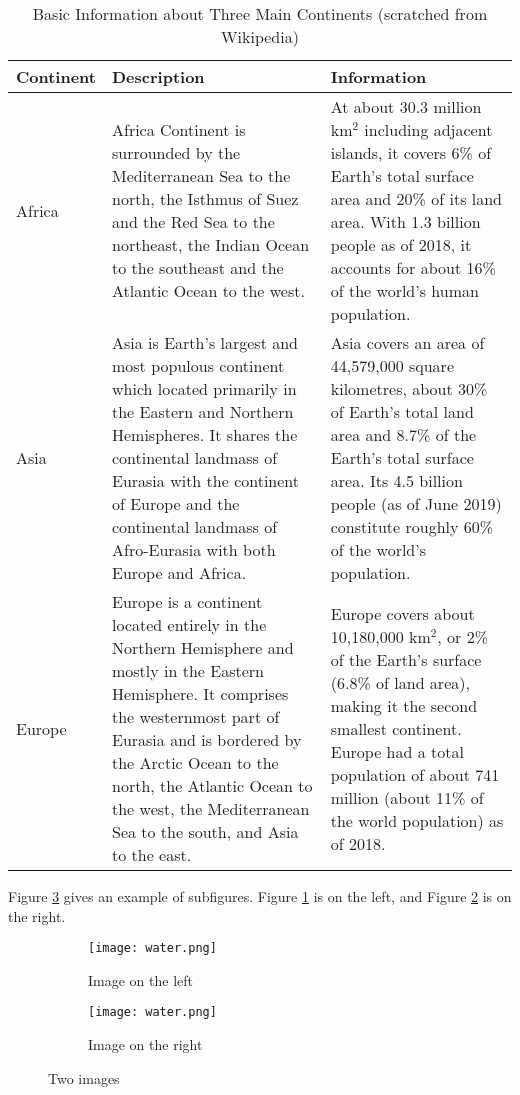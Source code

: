 \documentclass[12pt]{article}  %
\begin{document}
\begin{longtable}{ p{4em} p{14em} p{14em} }
\caption{Basic Information about Three Main Continents (scratched from Wikipedia)}
\label{tb:longtable}\\
\toprule
Continent & Description & Information \\
\midrule
Africa & Africa Continent is surrounded by the Mediterranean Sea to the
north, the Isthmus of Suez and the Red Sea to the northeast, the Indian
Ocean to the southeast and the Atlantic Ocean to the west. &
At about 30.3 million km$^2$ including adjacent islands, it covers 6\%
of Earth's total surface area and 20\% of its land area. With 1.3
billion people as of 2018, it accounts for about 16\% of the world's
human population. \\
\midrule
Asia & Asia is Earth's largest and most populous continent which
located primarily in the Eastern and Northern Hemispheres.
It shares the continental landmass of Eurasia with the continent
of Europe and the continental landmass of Afro-Eurasia with both
Europe and Africa. &
Asia covers an area of 44,579,000 square kilometres, about 30\%
of Earth's total land area and 8.7\% of the Earth's total surface
area. Its 4.5 billion people (as of June 2019) constitute roughly
60\% of the world's population. \\
\midrule
Europe & Europe is a continent located entirely in the Northern
Hemisphere and mostly in the Eastern Hemisphere. It comprises the
westernmost part of Eurasia and is bordered by the Arctic Ocean to
the north, the Atlantic Ocean to the west, the Mediterranean Sea to
the south, and Asia to the east. &
Europe covers about 10,180,000 km$^2$, or 2\% of the Earth's surface
(6.8\% of land area), making it the second smallest
continent. Europe had a total population of about 741 million (about
11\% of the world population) as of 2018. \\
\bottomrule
\end{longtable}

Figure \ref{fig:subfigures} gives an example of subfigures. Figure \ref{subfig:left} is on the left, and Figure \ref{subfig:right} is on the right.

\begin{figure}[htbp]
\centering
\begin{subfigure}[b]{.4\textwidth}
\texttt{[image: water.png]}
\caption{Image on the left}\label{subfig:left}
\end{subfigure}
\begin{subfigure}[b]{.4\textwidth}
\texttt{[image: water.png]}
\caption{Image on the right}\label{subfig:right}
\end{subfigure}
\caption{Two images}\label{fig:subfigures}
\end{figure}
\end{document}

